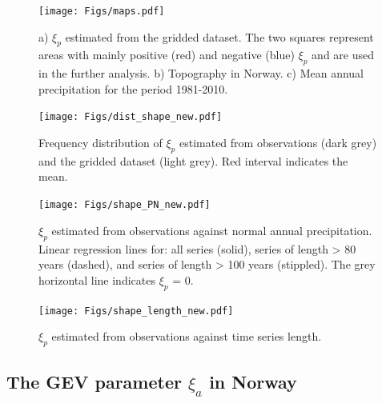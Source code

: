 \documentclass[12pt,a4paper,english]{article}
\begin{document}
\clearpage    

\begin{figure}[htbp]
\begin{minipage}[t]{0.98\textwidth}
\begin{center}
\texttt{[image: Figs/maps.pdf]} 
\vspace{-10mm}
\caption[shape]{\label{data:fig2}a) $\xi_{p}$ estimated from the gridded dataset. The two squares represent areas with mainly positive (red) and negative (blue) $\xi_{p}$ and are used in the further analysis. b) Topography in Norway. c) Mean annual precipitation for the period 1981-2010.}
\end{center}
\end{minipage}

\begin{minipage}[t]{0.48\textwidth}
\centering
\texttt{[image: Figs/dist\_shape\_new.pdf]}
\caption[shape]{\label{data:fig3}Frequency distribution of $\xi_{p}$ estimated from observations (dark grey) and the gridded dataset (light grey). Red interval indicates the mean.}
\end{minipage}
\hspace{10mm}
\begin{minipage}[t]{0.52\textwidth}
\centering
\texttt{[image: Figs/shape\_PN\_new.pdf]}
\caption[shape]{\label{data:fig4}$\xi_{p}$ estimated from observations against normal annual precipitation. Linear regression lines for: all series (solid), series of length > 80 years (dashed), and series of length > 100 years (stippled). The grey horizontal line indicates $\xi_{p}$ = 0.}
\end{minipage}
\end{figure}

\clearpage

\begin{figure}[!htbp]
\begin{center}
\texttt{[image: Figs/shape\_length\_new.pdf]}
\caption[shape]{\label{data:fig5}$\xi_{p}$ estimated from observations against time series length.}
\end{center}
\end{figure}

\subsection{The GEV parameter $\xi_{a}$ in Norway}
\end{document}
